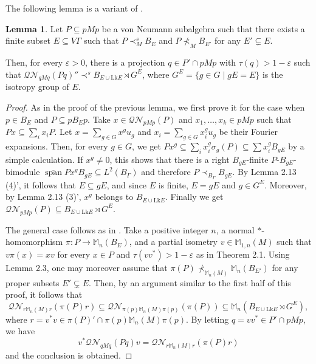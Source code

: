 \documentclass{amsart}
\theoremstyle{definition}
\newtheorem{lemma}[theorem]{Lemma}
\renewcommand{\subset}{\subseteq}
\newcommand{\Mat}{\mathbb{M}}
\begin{document}
The following lemma is a variant of \cite[Lemma 7.2]{im}. 
\begin{lemma}
Let $P\subset pMp$ be a von Neumann subalgebra such that there exists a finite subset $E\subset V\Gamma$ such that $P\prec^s_M B_E$ and $P\nprec_M B_{E'}$ for any $E'\subsetneq E$. 

Then, for every $\varepsilon>0$, there is a projection $q\in P'\cap pMp$ with $\tau(q)>1-\varepsilon$ such that $\mathcal{QN}_{qMq}(Pq)'' \prec^s B_{E\cup\mathrm{Lk}E}\rtimes G^E$, where $G^E = \{ g\in G \mid gE=E\}$ is the isotropy group of $E$.  
\end{lemma}
\begin{proof}
As in the proof of the previous lemma, we first prove it 
for the case when $p\in B_E$ and $P\subset pB_Ep$. 
Take $x\in \mathcal{QN}_{pMp}(P)$ and $x_1, \ldots, x_k \in pMp$ such that
$Px\subset \sum_i x_iP$. 
Let $x=\sum_{g\in G} x^gu_g$ and $x_i=\sum_{g\in G} x_i^gu_g$ be their Fourier expansions. 
Then, for every $g\in G$, we get 
$Px^g\subset\sum_i x_i^g\sigma_g(P)\subset \sum x_i^gB_{gE}$ by a simple calculation. 
If $x^g \neq 0$, this shows that there is a right $B_{gE}$-finite $P$-$B_{gE}$-bimodule 
$\overline{\mathop{span}} Px^gB_{gE} \subset L^2(B_{\Gamma})$ and therefore 
$P\prec_{B_{\Gamma}} B_{gE}$. By Lemma 2.13 (4)', it follows that $E\subset gE$, and since $E$ is finite, $E=gE$ and $g\in G^E$. Moreover, by Lemma 2.13 (3)', $x^g$ belongs to $B_{E\cup\mathrm{Lk}E}$. 
Finally we get $\mathcal{QN}_{pMp}(P)\subset B_{E\cup\mathrm{Lk}E}\rtimes G^E$. 

The general case follows as in \cite[Lemma 7.2 (ii)]{im}. 
Take a positive integer $n$, 
a normal $\ast$-homomorphism $\pi : P\to \Mat_n(B_E)$, 
and a partial isometry $v\in \Mat_{1,n}(M)$ such that 
$v\pi(x)=xv$ for every $x\in P$ 
and $\tau(vv^{\ast})>1-\varepsilon$
as in Theorem 2.1. 
Using Lemma 2.3, one may moreover assume that 
$\pi(P) \nprec_{\Mat_n(M)} \Mat_n(B_{E'})$ for any proper subsets $E'\subsetneq E$. 
Then, by an argument similar to the first half of this proof, 
it follows that 
\[
\mathcal{QN}_{r\Mat_n(M)r}(\pi(P)r)\subset \mathcal{QN}_{\pi(p)\Mat_n(M)\pi(p)}(\pi(P))\subset \Mat_n(B_{E\cup\mathrm{Lk}E}\rtimes G^E), 
\]
where $r=v^{\ast}v\in \pi(P)'\cap \pi(p)\Mat_n(M)\pi(p)$. 
By letting $q=vv^{\ast}\in P'\cap pMp$, we have
\[
v^{\ast} \mathcal{QN}_{qMq}(Pq) v = \mathcal{QN}_{r\Mat_n(M)r}(\pi(P)r)
\]
and the conclusion is obtained. 



\end{proof}
\end{document}
